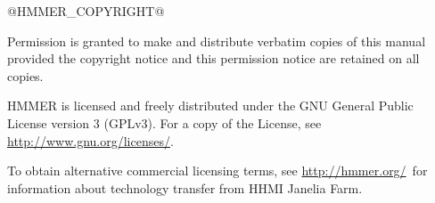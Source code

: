 \vspace*{\fill}
\begin{flushleft}
@HMMER_COPYRIGHT@\vspace{5mm}

\vspace{5mm}
Permission is granted to make and distribute verbatim copies of this
manual provided the copyright notice and this permission notice are
retained on all copies.\vspace{5mm}

\vspace{5mm} HMMER is licensed and freely distributed under the GNU
General Public License version 3 (GPLv3). For a copy of the License,
see \url{http://www.gnu.org/licenses/}.

\vspace{5mm}

To obtain alternative commercial licensing terms, see
\url{http://hmmer.org/}\ for information about technology transfer
from HHMI Janelia Farm.

\vspace{5mm}
\end{flushleft}



